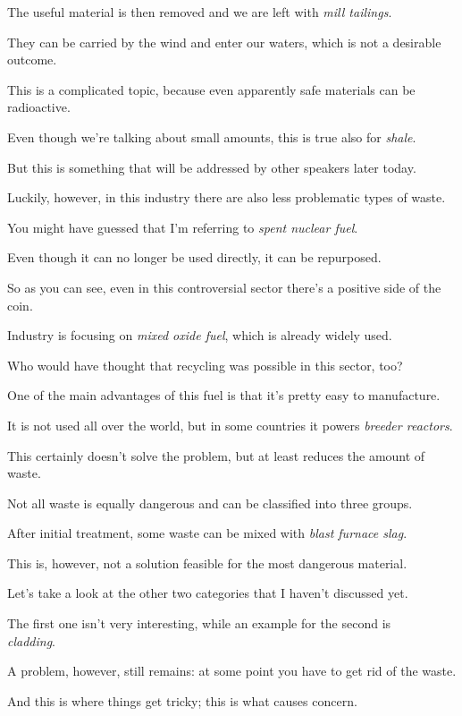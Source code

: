 The useful material is then removed and we are left with \textit{mill tailings}.

They can be carried by the wind and enter our waters, which is not a desirable outcome.

\ex This is a complicated topic, because even apparently safe materials can be radioactive.

Even though we're talking about small amounts, this is true also for \textit{shale}.

But this is something that will be addressed by other speakers later today.

\ex Luckily, however, in this industry there are also less problematic types of waste.

You might have guessed that I'm referring to \textit{spent nuclear fuel}.

Even though it can no longer be used directly, it can be repurposed.

\ex So as you can see, even in this controversial sector there's a positive side of the coin.

Industry is focusing on \textit{mixed oxide fuel}, which is already widely used.

Who would have thought that recycling was possible in this sector, too?

\ex One of the main advantages of this fuel is that it's pretty easy to manufacture.

It is not used all over the world, but in some countries it powers \textit{breeder reactors}.

This certainly doesn't solve the problem, but at least reduces the amount of waste.

\ex Not all waste is equally dangerous and can be classified into three groups.

After initial treatment, some waste can be mixed with \textit{blast furnace slag}.

This is, however, not a solution feasible for the most dangerous material.

\ex Let's take a look at the other two categories that I haven't discussed yet.

The first one isn't very interesting, while an example for the second is \\ \textit{cladding}.

A problem, however, still remains: at some point you have to get rid of the waste. 

\ex And this is where things get tricky; this is what causes concern.

